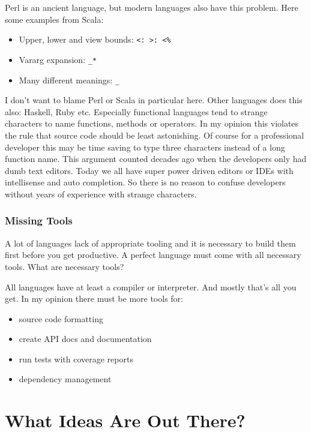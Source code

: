 \documentclass[a4paper,12pt]{article}
\begin{document}
Perl is an ancient language, but modern languages also have this problem. Here some examples from Scala\cite{special-operators-scala}:

\begin{itemize}
	\item Upper, lower and view bounds: \verb|<: >: <%|
	\item Vararg expansion: \verb|_*|
	\item Many different meanings: \verb|_|
\end{itemize}

I don't want to blame Perl or Scala in particular here. Other languages does this also: Haskell, Ruby etc. Especially functional languages tend to strange characters to name functions, methods or operators. In my opinion this violates the rule that source code should be least astonishing. Of course for a professional developer this may be time saving to type three characters instead of a long function name. This argument counted decades ago when the developers only had dumb text editors. Today we all have super power driven editors or IDEs with intellisense and auto completion. So there is no reason to confuse developers without years of experience with strange characters.

\subsubsection{Missing Tools}

A lot of languages lack of appropriate tooling and it is necessary to build them first before you get productive. A perfect language must come with all necessary tools. What are necessary tools?

All languages have at least a compiler or interpreter. And mostly that's all you get. In my opinion there must be more tools for:

\begin{itemize}
    \item source code formatting
    \item create API docs and documentation
    \item run tests with coverage reports
    \item dependency management
\end{itemize}

\section{What Ideas Are Out There?}
\end{document}
